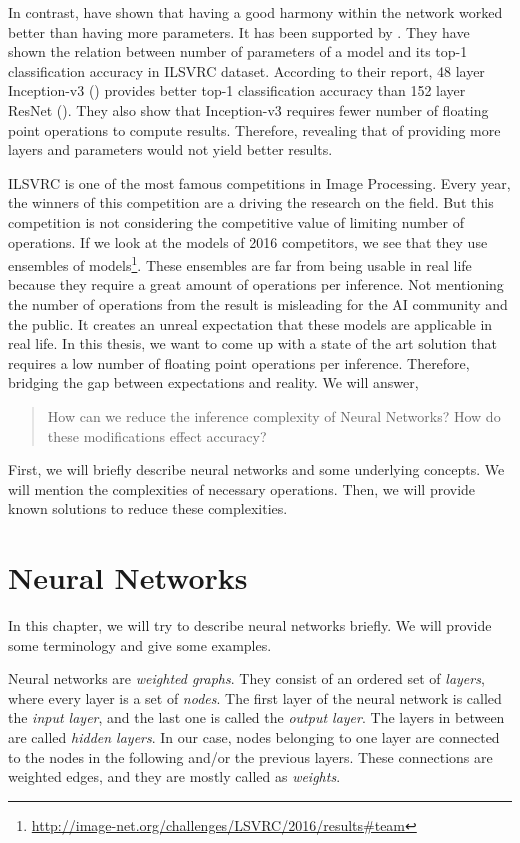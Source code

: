 In contrast, \cite{Szegedy:2014aa} have shown that having a good harmony within the network worked better than having more parameters. It has been supported by \cite{Canziani:2016aa}. They have shown the relation between number of parameters of a model and its top-1 classification accuracy in ILSVRC dataset. According to their report, 48 layer Inception-v3 (\cite{Szegedy_2016_CVPR}) provides better top-1 classification accuracy than 152 layer ResNet (\cite{He:2015aa}). They also show that Inception-v3 requires fewer number of floating point operations to compute results. Therefore, revealing that of providing more layers and parameters would not yield better results. 

ILSVRC is one of the most famous competitions in Image Processing. Every year, the winners of this competition are a driving the research on the field. But this competition is not considering the competitive value of limiting number of operations. If we look at the models of 2016 competitors, we see that they use ensembles of models\footnote{\url{http://image-net.org/challenges/LSVRC/2016/results\#team}}. These ensembles are far from being usable in real life because they require a great amount of operations per inference. Not mentioning the number of operations from the result is misleading for the AI community and the public. It creates an unreal expectation that these models are applicable in real life. In this thesis, we want to come up with a state of the art solution that requires a low number of floating point operations per inference. Therefore, bridging the gap between expectations and reality. We will answer,
\begin{quote}
How can we reduce the inference complexity of Neural Networks?
How do these modifications effect accuracy?
\end{quote}
First, we will briefly describe neural networks and some underlying concepts. We will mention the complexities of necessary operations. Then, we will provide known solutions to reduce these complexities.

\section{Neural Networks}
In this chapter, we will try to describe neural networks briefly. We will provide some terminology and give some examples. 

Neural networks are \textit{weighted graphs}. They consist of an ordered set of \textit{layers}, where every layer is a set of \textit{nodes}. The first layer of the neural network is called the \textit{input layer}, and the last one is called the \textit{output layer}. The layers in between are called \textit{hidden layers}. In our case, nodes belonging to one layer are connected to the nodes in the following and/or the previous layers. These connections are weighted edges, and they are mostly called as \textit{weights}. 

